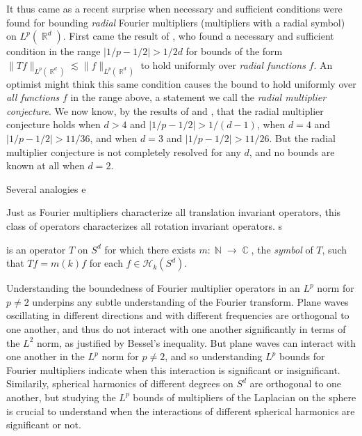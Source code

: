 \documentclass[12pt]{article}
\DeclareMathOperator{\ZZ}{\mathbb{Z}}
\DeclareMathOperator{\RR}{\mathbb{R}}
\DeclareMathOperator{\NN}{\mathbb{N}}
\DeclareMathOperator{\CC}{\mathbb{C}}
\begin{document}
It thus came as a recent surprise when necessary and sufficient conditions were found for bounding \emph{radial} Fourier multipliers (multipliers with a radial symbol) on $L^p(\RR^d)$. First came the result of \cite{GarrigosSeeger}, who found a necessary and sufficient condition in the range $|1/p - 1/2| > 1/2d$ for bounds of the form $\| Tf \|_{L^p(\RR^d)} \lesssim \| f \|_{L^p(\RR^d)}$ to hold uniformly over \emph{radial functions} $f$.
An optimist might think this same condition causes the bound to hold uniformly over \emph{all functions} $f$ in the range above, a statement we call the \emph{radial multiplier conjecture}. We now know, by the results of \cite{HeoNazarovSeeger} and \cite{Cladek}, that the radial multiplier conjecture holds when $d > 4$ and $|1/p - 1/2| > 1/(d-1)$, when $d = 4$ and $|1/p - 1/2| > 11/36$, and when $d = 3$ and $|1/p - 1/2| > 11/26$. But the radial multiplier conjecture is not completely resolved for any $d$, and no bounds are known at all when $d = 2$.

Several analogies e


Just as Fourier multipliers characterize all translation invariant operators, this class of operators characterizes all rotation invariant operators. 
s



 is an operator $T$ on $S^d$ for which there exists $m: \NN \to \CC$, the \emph{symbol} of $T$, such that $Tf = m(k) f$ for each $f \in \mathcal{H}_k(S^d)$.

Understanding the boundedness of Fourier multiplier operators in an $L^p$ norm for $p \neq 2$ underpins any subtle understanding of the Fourier transform. Plane waves oscillating in different directions and with different frequencies are orthogonal to one another, and thus do not interact with one another significantly in terms of the $L^2$ norm, as justified by Bessel's inequality. But plane waves can interact with one another in the $L^p$ norm for $p \neq 2$, and so understanding $L^p$ bounds for Fourier multipliers indicate when this interaction is significant or insignificant. Similarily, spherical harmonics of different degrees on $S^d$ are orthogonal to one another, but studying the $L^p$ bounds of multipliers of the Laplacian on the sphere is crucial to understand when the interactions of different spherical harmonics are significant or not.
\end{document}
